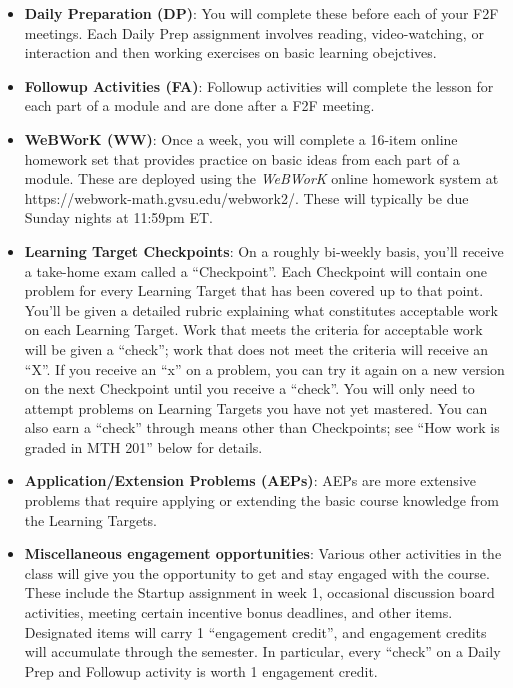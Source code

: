 \documentclass[]{article}
\providecommand{\tightlist}{%
  \setlength{\itemsep}{0pt}\setlength{\parskip}{0pt}}
\begin{document}
\begin{itemize}
\tightlist
\item
  \textbf{Daily Preparation (DP)}: You will complete these before each
  of your F2F meetings. Each Daily Prep assignment involves reading,
  video-watching, or interaction and then working exercises on basic
  learning obejctives.
\item
  \textbf{Followup Activities (FA)}: Followup activities will complete
  the lesson for each part of a module and are done after a F2F meeting.
\item
  \textbf{WeBWorK (WW)}: Once a week, you will complete a 16-item online
  homework set that provides practice on basic ideas from each part of a
  module. These are deployed using the \emph{WeBWorK} online homework
  system at https://webwork-math.gvsu.edu/webwork2/. These will
  typically be due Sunday nights at 11:59pm ET.
\item
  \textbf{Learning Target Checkpoints}: On a roughly bi-weekly basis,
  you'll receive a take-home exam called a ``Checkpoint''. Each
  Checkpoint will contain one problem for every Learning Target that has
  been covered up to that point. You'll be given a detailed rubric
  explaining what constitutes acceptable work on each Learning Target.
  Work that meets the criteria for acceptable work will be given a
  ``check''; work that does not meet the criteria will receive an ``X''.
  If you receive an ``x'' on a problem, you can try it again on a new
  version on the next Checkpoint until you receive a ``check''. You will
  only need to attempt problems on Learning Targets you have not yet
  mastered. You can also earn a ``check'' through means other than
  Checkpoints; see ``How work is graded in MTH 201'' below for details.
\item
  \textbf{Application/Extension Problems (AEPs)}: AEPs are more
  extensive problems that require applying or extending the basic course
  knowledge from the Learning Targets.
\item
  \textbf{Miscellaneous engagement opportunities}: Various other
  activities in the class will give you the opportunity to get and stay
  engaged with the course. These include the Startup assignment in week
  1, occasional discussion board activities, meeting certain incentive
  bonus deadlines, and other items. Designated items will carry 1
  ``engagement credit'', and engagement credits will accumulate through
  the semester. In particular, every ``check'' on a Daily Prep and
  Followup activity is worth 1 engagement credit.
\end{itemize}
\end{document}
